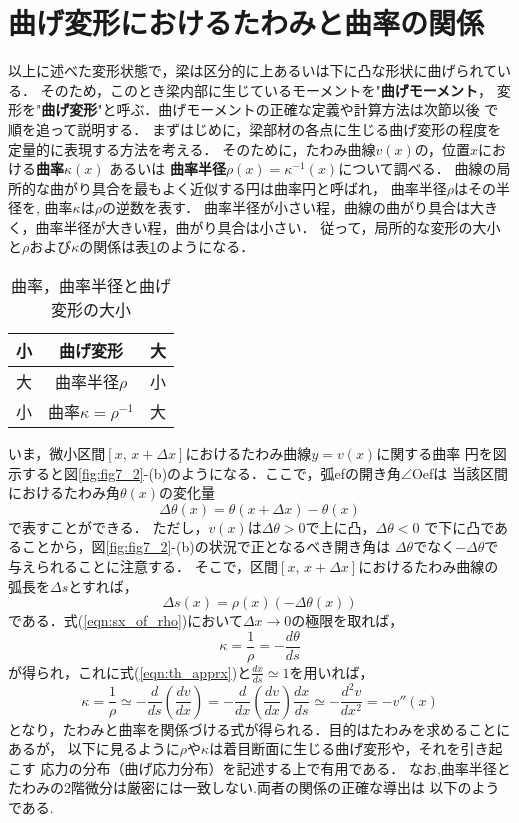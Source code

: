 \documentclass[10pt,a4j]{jbook}
\begin{document}
\section{曲げ変形におけるたわみと曲率の関係}
以上に述べた変形状態で，梁は区分的に上あるいは下に凸な形状に曲げられている．
そのため，このとき梁内部に生じているモーメントを"{\bf 曲げモーメント}，
変形を"{\bf 曲げ変形}"と呼ぶ．曲げモーメントの正確な定義や計算方法は次節以後
で順を追って説明する．
まずはじめに，梁部材の各点に生じる曲げ変形の程度を定量的に表現する方法を考える．
そのために，たわみ曲線$v(x)$の，位置$x$における{\bf 曲率}$\kappa(x)$ あるいは
{\bf 曲率半径}$\rho(x)=\kappa^{-1}(x)$について調べる．
曲線の局所的な曲がり具合を最もよく近似する円は曲率円と呼ばれ，
曲率半径$\rho$はその半径を, 曲率$\kappa$は$\rho$の逆数を表す．
曲率半径が小さい程，曲線の曲がり具合は大きく，曲率半径が大きい程，曲がり具合は小さい．
従って，局所的な変形の大小と$\rho$および$\kappa$の関係は表\ref{tbl:tbl7_1}のようになる．
\begin{table}
\caption{曲率，曲率半径と曲げ変形の大小}
\begin{center}
\begin{tabular}{c|c|c}
小& 曲げ変形 & 大\\
\hline\hline
大&曲率半径$\rho$ & 小\\
\hline
	小& 曲率$\kappa=\rho^{-1}$& 大\\
\end{tabular}
\end{center}
\label{tbl:tbl7_1}
\end{table}
いま，微小区間$[x,\, x+\Delta x]$におけるたわみ曲線$y=v(x)$に関する曲率
円を図示すると図\ref{fig:fig7_2}-(b)のようになる．ここで，弧efの開き角$\angle$Oefは 
当該区間におけるたわみ角$\theta(x)$の変化量
\begin{equation}
	\Delta \theta (x)=\theta(x+\Delta x)- \theta(x)
	\label{eqn:del_theta}
\end{equation}
で表すことができる．
ただし，$v(x)$は$\Delta \theta >0$で上に凸，$\Delta \theta<0$
で下に凸であることから，図\ref{fig:fig7_2}-(b)の状況で正となるべき開き角は
$\Delta \theta$でなく$-\Delta \theta$で与えられることに注意する．
そこで，区間$[x,\,x+\Delta x]$におけるたわみ曲線の弧長を$\Delta s$とすれば，
\begin{equation}
	\Delta s(x) = \rho (x) \left(-\Delta \theta (x) \right)
	\label{eqn:sx_of_rho}
\end{equation}
である．式(\ref{eqn:sx_of_rho})において$\Delta x \rightarrow 0$の極限を取れば，
\begin{equation}
	\kappa = \frac{1}{\rho}=-\frac{d\theta}{ds}	
\end{equation}
が得られ，これに式(\ref{eqn:th_apprx})と$\frac{dx}{ds}\simeq 1$を用いれば，
\begin{equation}
	\kappa=\frac{1}{\rho}\simeq 
	-\frac{d}{ds}\left( \frac{dv}{dx}\right)	
	=
	-\frac{d}{dx}\left( \frac{dv}{dx}\right)	\frac{dx}{ds}
	\simeq
	-\frac{d^2 v}{dx^2}=-v''(x)
	\label{eqn:kpp_v2}
\end{equation}
となり，たわみと曲率を関係づける式が得られる．目的はたわみを求めることにあるが，
以下に見るように$\rho$や$\kappa$は着目断面に生じる曲げ変形や，それを引き起こす
応力の分布（曲げ応力分布）を記述する上で有用である．
なお,曲率半径とたわみの2階微分は厳密には一致しない.両者の関係の正確な導出は
以下のようである.
\end{document}
